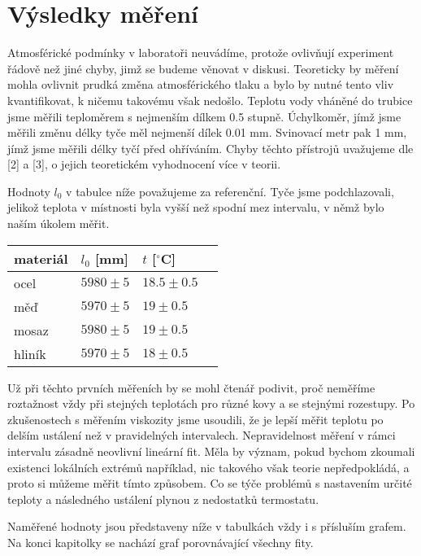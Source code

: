 \documentclass{article}
\begin{document}
\section*{Výsledky měření}
\par Atmosférické podmínky v laboratoři neuvádíme, protože ovlivňují experiment řádově než jiné chyby, jimž se budeme věnovat v diskusi. Teoreticky by měření mohla ovlivnit prudká změna atmosférického tlaku a bylo by nutné tento vliv kvantifikovat, k ničemu takovému však nedošlo. Teplotu vody vháněné do trubice jsme měřili teploměrem s nejmenším dílkem 0.5 stupně. Úchylkoměr, jímž jsme měřili změnu délky tyče měl nejmenší dílek 0.01 mm. Svinovací metr pak 1 mm, jímž jsme měřili délky tyčí před ohříváním. Chyby těchto přístrojů uvažujeme dle [2] a [3], o jejich teoretickém vyhodnocení více v teorii.
\par Hodnoty $l_{0}$ v tabulce níže považujeme za referenční. Tyče jsme podchlazovali, jelikož teplota v místnosti byla vyšší než spodní mez intervalu, v němž bylo naším úkolem měřit.
\begin{center}
    \label{tab:title}
    \begin{tabular}{ | l | l | l | p{4cm} |} \hline
    materiál & $l_{0}$ [mm] & $t$ [$^\circ$C] \\ \hline
    ocel & $5980\pm5$ & $18.5\pm0.5$ \\ \hline
    měď & $5970\pm5$ & $19\pm0.5$ \\ \hline
    mosaz & $5980\pm5$ & $19\pm0.5$ \\ \hline
    hliník & $5970\pm5$ & $18\pm0.5$ \\ \hline
    \end{tabular}
\end{center}
Už při těchto prvních měřeních by se mohl čtenář podivit, proč neměříme roztažnost vždy při stejných teplotách pro různé kovy a se stejnými rozestupy. Po zkušenostech s měřením viskozity jsme usoudili, že je lepší měřit teplotu po delším ustálení než v pravidelných intervalech. Nepravidelnost měření v rámci intervalu zásadně neovlivní lineární fit. Měla by význam, pokud bychom zkoumali existenci lokálních extrémů například, nic takového však teorie nepředpokládá, a proto si můžeme měřit tímto způsobem. Co se týče problémů s nastavením určité teploty a následného ustálení plynou z nedostatků termostatu.
\par Naměřené hodnoty jsou představeny níže v tabulkách vždy i s přísluším grafem. Na konci kapitolky se nachází graf porovnávající všechny fity.
\end{document}

